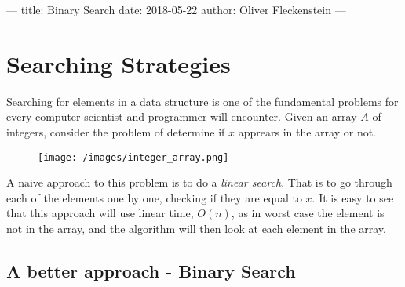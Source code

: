 ---
title: Binary Search
date: 2018-05-22
author: Oliver Fleckenstein
---
\section{Searching Strategies}

    Searching for elements in a data structure is one of the fundamental problems for every computer scientist and programmer will encounter.
    Given an array $A$ of integers, consider the problem of determine if $x$ apprears in the array or not.

    \begin{figure}
        \centering
        \texttt{[image: /images/integer\_array.png]}
    \end{figure}

    A naive approach to this problem is to do a \emph{linear search}.
    That is to go through each of the elements one by one, checking if they are equal to $x$.
    It is easy to see that this approach will use linear time, $O(n)$, as in worst case the element is not in the array, and the algorithm will then look at each element in the array.

    \subsection{A better approach - Binary Search}

